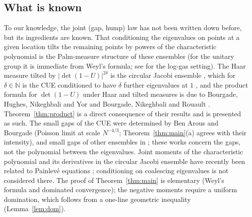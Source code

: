 \documentclass[12pt]{amsart}
\theoremstyle{remark}
\newcommand{\1}{\mathbf{1}}
\begin{document}
\subsection*{What is known}
To our knowledge, the joint (gap, hump) law has not been written down
before, but its ingredients are known. That conditioning the eigenvalues
on points at a given location tilts the remaining points by powers of the
characteristic polynomial is the Palm-measure structure of these ensembles
(for the unitary group it is immediate from Weyl's formula; see
\cite{For10} for the log-gas setting). The Haar measure tilted by
$|\det(1-U)|^{2\delta}$ is the circular Jacobi ensemble \cite{For10,BNR09},
which for $\delta\in\mathbb N$ is the CUE conditioned to have $\delta$
further eigenvalues at $1$ \cite[\S1.1]{BNR09}, and the product formula for
$\det(1-U)$ under Haar and tilted measures is due to Bourgade, Hughes,
Nikeghbali and Yor \cite{BHNY08} and Bourgade, Nikeghbali and Rouault
\cite{BNR09}. Theorem~\ref{thm:product} is a direct consequence of their
results and is presented as such. The small gaps of the CUE were
determined by Ben Arous and Bourgade \cite{BAB13} (Poisson limit at scale
$N^{-4/3}$; Theorem~\ref{thm:main}(a) agrees with their intensity), and
small gaps of other ensembles in \cite{FTW19,FW21,Bou22}; these works
concern the gaps, not the polynomial between the eigenvalues. Joint
moments of the characteristic polynomial and its derivatives in the
circular Jacobi ensemble have recently been related to Painlev\'e
equations \cite{BW26}; conditioning on coalescing eigenvalues is not
considered there. The proof of Theorem~\ref{thm:main} is elementary
(Weyl's formula and dominated convergence); the negative moments require a
uniform domination, which follows from a one-line geometric inequality
(Lemma~\ref{lem:dom}).
\end{document}
